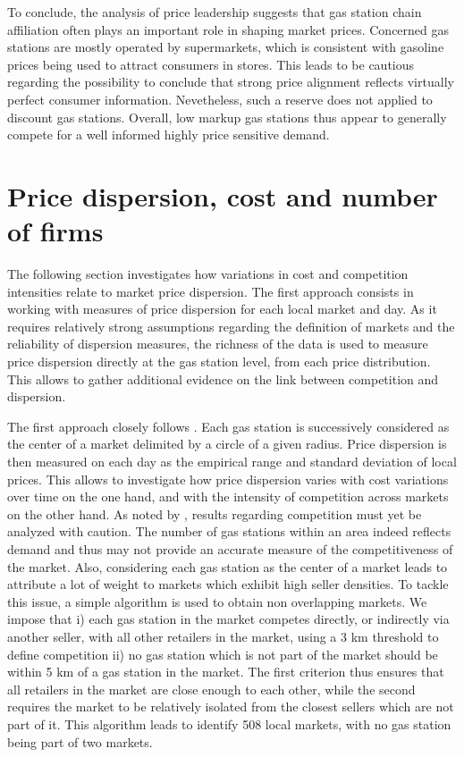 \documentclass[english]{article}
\begin{document}
To conclude, the analysis of price leadership suggests that gas station chain affiliation often plays an important role in shaping market prices. Concerned gas stations are mostly operated by supermarkets, which is consistent with gasoline prices being used to attract consumers in stores. This leads to be cautious regarding the possibility to conclude that strong price alignment reflects virtually perfect consumer information. Nevetheless, such a reserve does not applied to discount gas stations. Overall, low markup gas stations thus appear to generally compete for a well informed highly price sensitive demand.

\section{Price dispersion, cost and number of firms}

The following section investigates how variations in cost and competition intensities relate to market price dispersion. The first approach consists in working with measures of price dispersion for each local market and day. As it requires relatively strong assumptions regarding the definition of markets and the reliability of dispersion measures, the richness of the data is used to measure price dispersion directly at the gas station level, from each price distribution. This allows to gather additional evidence on the link between competition and dispersion.

The first approach closely follows \cite{TAP11}. Each gas station is successively considered as the center of a market delimited by a circle of a given radius. Price dispersion is then measured on each day as the empirical range and standard deviation of local prices. This allows to investigate how price dispersion varies with cost variations over time on the one hand, and with the intensity of competition across markets on the other hand. As noted by \cite{TAP11}, results regarding competition must yet be analyzed with caution. The number of gas stations within an area indeed reflects demand and thus may not provide an accurate measure of the competitiveness of the market. Also, considering each gas station as the center of a market leads to attribute a lot of weight to markets which exhibit high seller densities. To tackle this issue, a simple algorithm is used to obtain non overlapping markets. We impose that i) each gas station in the market competes directly, or indirectly via another seller, with all other retailers in the market, using a 3 km threshold to define competition ii) no gas station which is not part of the market should be within 5 km of a gas station in the market. The first criterion thus ensures that all retailers in the market are close enough to each other, while the second requires the market to be relatively isolated from the closest sellers which are not part of it. This algorithm leads to identify 508 local markets, with no gas station being part of two markets.
\end{document}
